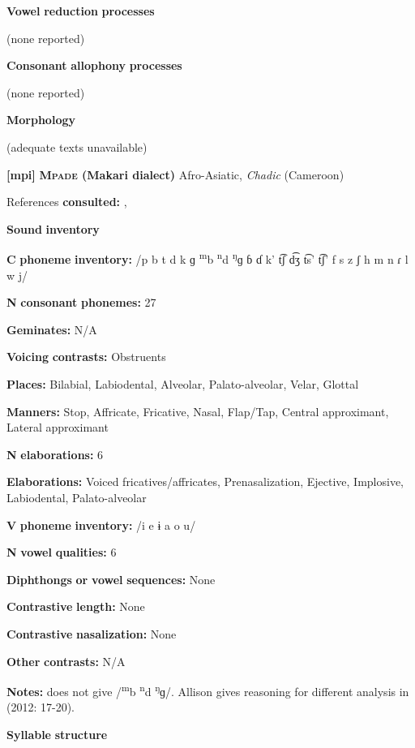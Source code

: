 \textbf{Vowel} \textbf{reduction} \textbf{processes}

(none reported)

\textbf{Consonant} \textbf{allophony} \textbf{processes}

(none reported)

\textbf{Morphology}

(adequate texts unavailable)

\textbf{[mpi]}   \textbf{\textsc{Mpade} \textbf{(Makari} \textbf{dialect)}}  Afro-Asiatic, \textit{Chadic} (Cameroon)

References \textbf{consulted:} \citet{Allison2012}, \citet{Mahamat2005}

\textbf{Sound} \textbf{inventory}

\textbf{C} \textbf{phoneme} \textbf{inventory:} /p b t d k ɡ \textsuperscript{m}b \textsuperscript{n}d \textsuperscript{ŋ}ɡ ɓ ɗ k’ t͡ʃ d͡ʒ t͡s’ t͡ʃ’ f s z ʃ h m n ɾ l w j/

\textbf{N} \textbf{consonant} \textbf{phonemes:} 27

\textbf{Geminates:} N/A

\textbf{Voicing} \textbf{contrasts:} Obstruents

\textbf{Places:} Bilabial, Labiodental, Alveolar, Palato-alveolar, Velar, Glottal

\textbf{Manners:} Stop, Affricate, Fricative, Nasal, Flap/Tap, Central approximant, Lateral approximant

\textbf{N} \textbf{elaborations:} 6

\textbf{Elaborations:} Voiced fricatives/affricates, Prenasalization, Ejective, Implosive, Labiodental, Palato-alveolar

\textbf{V} \textbf{phoneme} \textbf{inventory:} /i e ɨ a o u/

\textbf{N} \textbf{vowel} \textbf{qualities:} 6

\textbf{Diphthongs} \textbf{or} \textbf{vowel} \textbf{sequences:} None

\textbf{Contrastive} \textbf{length:} None

\textbf{Contrastive} \textbf{nasalization:} None

\textbf{Other} \textbf{contrasts:} N/A

\textbf{Notes:} \citet{Mahamat2005} does not give /\textsuperscript{m}b \textsuperscript{n}d \textsuperscript{ŋ}ɡ/. Allison gives reasoning for different analysis in (2012: 17-20).

\textbf{Syllable} \textbf{structure}

